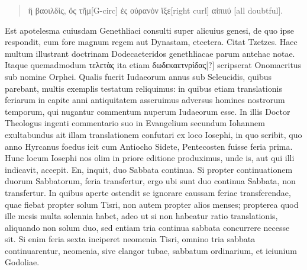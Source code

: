 \begin{parnumbers}
\begin{quote}
\begin{greek}
ἢ βαοιλδὶς, ὂς τῆμ[G-circ] ἐς οὐρανὸν ἴξε[right curl] αἰπιιύ [all doubtful].
\end{greek}
\end{quote}
Est apotelesma cuiusdam Genethliaci consulti super alicuius genesi,
de quo ipse respondit, eum fore magnum regem aut Dynastam, etcetera.
Citat Tzetzes. 
Haec multum illustrant doctrinam Dodecaeteridos
genethliacae parum antehac notae.
Itaque quemadmodum \textgreek{τελετὰς}
ita etiam \textgreek{δωδεκαετνρίδας[?]} scripserat Onomacritus sub nomine
Orphei.
Qualis fuerit Iudaeorum annus sub Seleucidis, quibus parebant,
multis exemplis testatum reliquimus: in quibus etiam translationis
feriarum in capite anni antiquitatem asseruimus adversus homines
nostrorum temporum, qui nugantur commentum nuperum
Iudaeorum esse.
In illis Doctor Theologus ingenti commentario
suo in Evangelium secundum Iohannem exultabundus ait illam
translationem confutari ex loco Iosephi, in quo scribit, quo anno
Hyrcanus foedus icit cum Antiocho Sidete, Pentecosten fuisse feria
prima.
Hunc locum Iosephi nos olim in priore editione produximus,
unde is, aut qui illi indicavit, accepit.
En, inquit, duo Sabbata continua.
Si propter continuationem duorum Sabbatorum, feria transfertur,
ergo ubi sunt duo continua Sabbata, non transfertur. 
In quibus
aperte ostendit se ignorare caussam feriae transferendae, quae fiebat
propter solum Tisri, non autem propter alios menses; propterea
quod ille mesis multa solennia habet, adeo ut si non habeatur
ratio translationis, aliquando non solum duo, sed entiam tria continua
sabbata concurrere necesse sit.
{}
Si enim feria sexta inciperet
neomenia Tisri, omnino tria sabbata continuarentur, neomenia,
sive clangor tubae, sabbatum ordinarium, et ieiunium Godoliae.


\end{parnumbers}
